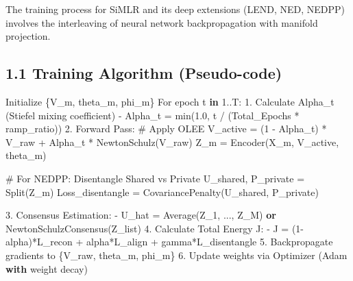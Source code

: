 \documentclass[
  letterpaper,
]{report}
\newenvironment{Shaded}{\begin{snugshade}}{\end{snugshade}}
\newcommand{\BuiltInTok}[1]{\textcolor[rgb]{0.00,0.23,0.31}{#1}}
\newcommand{\CommentTok}[1]{\textcolor[rgb]{0.37,0.37,0.37}{#1}}
\newcommand{\ControlFlowTok}[1]{\textcolor[rgb]{0.00,0.23,0.31}{\textbf{#1}}}
\newcommand{\DecValTok}[1]{\textcolor[rgb]{0.68,0.00,0.00}{#1}}
\newcommand{\FloatTok}[1]{\textcolor[rgb]{0.68,0.00,0.00}{#1}}
\newcommand{\KeywordTok}[1]{\textcolor[rgb]{0.00,0.23,0.31}{\textbf{#1}}}
\newcommand{\NormalTok}[1]{\textcolor[rgb]{0.00,0.23,0.31}{#1}}
\newcommand{\OperatorTok}[1]{\textcolor[rgb]{0.37,0.37,0.37}{#1}}
\begin{document}
The training process for SiMLR and its deep extensions (LEND, NED,
NEDPP) involves the interleaving of neural network backpropagation with
manifold projection.

\subsection{1.1 Training Algorithm
(Pseudo-code)}\label{training-algorithm-pseudo-code}

\begin{Shaded}
\begin{Highlighting}[]
\NormalTok{Initialize \{V\_m, theta\_m, phi\_m\}}
\NormalTok{For epoch t }\KeywordTok{in} \FloatTok{1.}\NormalTok{.T:}
    \FloatTok{1.}\NormalTok{ Calculate Alpha\_t (Stiefel mixing coefficient)}
       \OperatorTok{{-}}\NormalTok{ Alpha\_t }\OperatorTok{=} \BuiltInTok{min}\NormalTok{(}\FloatTok{1.0}\NormalTok{, t }\OperatorTok{/}\NormalTok{ (Total\_Epochs }\OperatorTok{*}\NormalTok{ ramp\_ratio))}
    \FloatTok{2.}\NormalTok{ Forward Pass:}
       \CommentTok{\# Apply OLEE}
\NormalTok{       V\_active }\OperatorTok{=}\NormalTok{ (}\DecValTok{1} \OperatorTok{{-}}\NormalTok{ Alpha\_t) }\OperatorTok{*}\NormalTok{ V\_raw }\OperatorTok{+}\NormalTok{ Alpha\_t }\OperatorTok{*}\NormalTok{ NewtonSchulz(V\_raw)}
\NormalTok{       Z\_m }\OperatorTok{=}\NormalTok{ Encoder(X\_m, V\_active, theta\_m)}
       
       \CommentTok{\# For NEDPP: Disentangle Shared vs Private}
\NormalTok{       U\_shared, P\_private }\OperatorTok{=}\NormalTok{ Split(Z\_m)}
\NormalTok{       Loss\_disentangle }\OperatorTok{=}\NormalTok{ CovariancePenalty(U\_shared, P\_private)}
       
    \FloatTok{3.}\NormalTok{ Consensus Estimation:}
       \OperatorTok{{-}}\NormalTok{ U\_hat }\OperatorTok{=}\NormalTok{ Average(Z\_1, ..., Z\_M) }\KeywordTok{or}\NormalTok{ NewtonSchulzConsensus(Z\_list)}
    \FloatTok{4.}\NormalTok{ Calculate Total Energy J:}
       \OperatorTok{{-}}\NormalTok{ J }\OperatorTok{=}\NormalTok{ (}\DecValTok{1}\OperatorTok{{-}}\NormalTok{alpha)}\OperatorTok{*}\NormalTok{L\_recon }\OperatorTok{+}\NormalTok{ alpha}\OperatorTok{*}\NormalTok{L\_align }\OperatorTok{+}\NormalTok{ gamma}\OperatorTok{*}\NormalTok{L\_disentangle}
    \FloatTok{5.}\NormalTok{ Backpropagate gradients to \{V\_raw, theta\_m, phi\_m\}}
    \FloatTok{6.}\NormalTok{ Update weights via Optimizer (Adam }\ControlFlowTok{with}\NormalTok{ weight decay)}
\end{Highlighting}
\end{Shaded}
\end{document}
